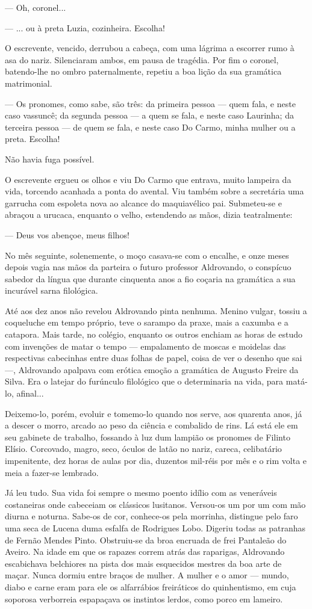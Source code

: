 --- Oh, coronel...

--- ... ou à preta Luzia, cozinheira. Escolha!

O escrevente, vencido, derrubou a cabeça, com uma lágrima a escorrer
rumo à asa do nariz. Silenciaram ambos, em pausa de tragédia. Por fim o
coronel, batendo-lhe no ombro paternalmente, repetiu a boa lição da sua
gramática matrimonial.

--- Os pronomes, como sabe, são três: da primeira pessoa --- quem fala,
e neste caso vassuncê; da segunda pessoa --- a quem se fala, e neste
caso Laurinha; da terceira pessoa --- de quem se fala, e neste caso Do
Carmo, minha mulher ou a preta. Escolha!

Não havia fuga possível.

O escrevente ergueu os olhos e viu Do Carmo que entrava, muito lampeira
da vida, torcendo acanhada a ponta do avental. Viu também sobre a
secretária uma garrucha com espoleta nova ao alcance do maquiavélico
pai. Submeteu-se e abraçou a urucaca, enquanto o velho, estendendo as
mãos, dizia teatralmente:

--- Deus vos abençoe, meus filhos!

No mês seguinte, solenemente, o moço casava-se com o encalhe, e onze
meses depois vagia nas mãos da parteira o futuro professor Aldrovando, o
conspícuo sabedor da língua que durante cinquenta anos a fio coçaria na
gramática a sua incurável sarna filológica.

Até aos dez anos não revelou Aldrovando pinta nenhuma. Menino vulgar,
tossiu a coqueluche em tempo próprio, teve o sarampo da praxe, mais a
caxumba e a catapora. Mais tarde, no colégio, enquanto os outros enchiam
as horas de estudo com invenções de matar o tempo --- empalamento de
moscas e moidelas das respectivas cabecinhas entre duas folhas de papel,
coisa de ver o desenho que sai ---, Aldrovando apalpava com erótica
emoção a gramática de Augusto Freire da Silva. Era o latejar do
furúnculo filológico que o determinaria na vida, para matá-lo, afinal...

Deixemo-lo, porém, evoluir e tomemo-lo quando nos serve, aos quarenta
anos, já a descer o morro, arcado ao peso da ciência e combalido de
rins. Lá está ele em seu gabinete de trabalho, fossando à luz dum
lampião os pronomes de Filinto Elísio. Corcovado, magro, seco, óculos de
latão no nariz, careca, celibatário impenitente, dez horas de aulas por
dia, duzentos mil-réis por mês e o rim volta e meia a fazer-se lembrado.

Já leu tudo. Sua vida foi sempre o mesmo poento idílio com as veneráveis
costaneiras onde cabeceiam os clássicos lusitanos. Versou-os um por um
com mão diurna e noturna. Sabe-os de cor, conhece-os pela morrinha,
distingue pelo faro uma seca de Lucena duma esfalfa de Rodrigues Lobo.
Digeriu todas as patranhas de Fernão Mendes Pinto. Obstruiu-se da broa
encruada de frei Pantaleão do Aveiro. Na idade em que os rapazes correm
atrás das raparigas, Aldrovando escabichava belchiores na pista dos mais
esquecidos mestres da boa arte de maçar. Nunca dormiu entre braços de
mulher. A mulher e o amor --- mundo, diabo e carne eram para ele os
alfarrábios freiráticos do quinhentismo, em cuja soporosa verborreia
espapaçava os instintos lerdos, como porco em lameiro.

